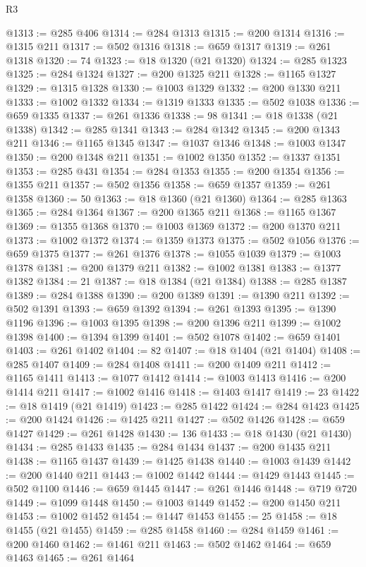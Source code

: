 \begin{lexlean}{R3}
\begin{coremodule}
@1313 := @285 @406
@1314 := @284 @1313
@1315 := @200 @1314
@1316 := @1315 @211
@1317 := @502 @1316
@1318 := @659 @1317
@1319 := @261 @1318
@1320 := 74
@1323 := @18 @1320 (@21 @1320)
@1324 := @285 @1323
@1325 := @284 @1324
@1327 := @200 @1325 @211
@1328 := @1165 @1327
@1329 := @1315 @1328
@1330 := @1003 @1329
@1332 := @200 @1330 @211
@1333 := @1002 @1332
@1334 := @1319 @1333
@1335 := @502 @1038
@1336 := @659 @1335
@1337 := @261 @1336
@1338 := 98
@1341 := @18 @1338 (@21 @1338)
@1342 := @285 @1341
@1343 := @284 @1342
@1345 := @200 @1343 @211
@1346 := @1165 @1345
@1347 := @1037 @1346
@1348 := @1003 @1347
@1350 := @200 @1348 @211
@1351 := @1002 @1350
@1352 := @1337 @1351
@1353 := @285 @431
@1354 := @284 @1353
@1355 := @200 @1354
@1356 := @1355 @211
@1357 := @502 @1356
@1358 := @659 @1357
@1359 := @261 @1358
@1360 := 50
@1363 := @18 @1360 (@21 @1360)
@1364 := @285 @1363
@1365 := @284 @1364
@1367 := @200 @1365 @211
@1368 := @1165 @1367
@1369 := @1355 @1368
@1370 := @1003 @1369
@1372 := @200 @1370 @211
@1373 := @1002 @1372
@1374 := @1359 @1373
@1375 := @502 @1056
@1376 := @659 @1375
@1377 := @261 @1376
@1378 := @1055 @1039
@1379 := @1003 @1378
@1381 := @200 @1379 @211
@1382 := @1002 @1381
@1383 := @1377 @1382
@1384 := 21
@1387 := @18 @1384 (@21 @1384)
@1388 := @285 @1387
@1389 := @284 @1388
@1390 := @200 @1389
@1391 := @1390 @211
@1392 := @502 @1391
@1393 := @659 @1392
@1394 := @261 @1393
@1395 := @1390 @1196
@1396 := @1003 @1395
@1398 := @200 @1396 @211
@1399 := @1002 @1398
@1400 := @1394 @1399
@1401 := @502 @1078
@1402 := @659 @1401
@1403 := @261 @1402
@1404 := 82
@1407 := @18 @1404 (@21 @1404)
@1408 := @285 @1407
@1409 := @284 @1408
@1411 := @200 @1409 @211
@1412 := @1165 @1411
@1413 := @1077 @1412
@1414 := @1003 @1413
@1416 := @200 @1414 @211
@1417 := @1002 @1416
@1418 := @1403 @1417
@1419 := 23
@1422 := @18 @1419 (@21 @1419)
@1423 := @285 @1422
@1424 := @284 @1423
@1425 := @200 @1424
@1426 := @1425 @211
@1427 := @502 @1426
@1428 := @659 @1427
@1429 := @261 @1428
@1430 := 136
@1433 := @18 @1430 (@21 @1430)
@1434 := @285 @1433
@1435 := @284 @1434
@1437 := @200 @1435 @211
@1438 := @1165 @1437
@1439 := @1425 @1438
@1440 := @1003 @1439
@1442 := @200 @1440 @211
@1443 := @1002 @1442
@1444 := @1429 @1443
@1445 := @502 @1100
@1446 := @659 @1445
@1447 := @261 @1446
@1448 := @719 @720
@1449 := @1099 @1448
@1450 := @1003 @1449
@1452 := @200 @1450 @211
@1453 := @1002 @1452
@1454 := @1447 @1453
@1455 := 25
@1458 := @18 @1455 (@21 @1455)
@1459 := @285 @1458
@1460 := @284 @1459
@1461 := @200 @1460
@1462 := @1461 @211
@1463 := @502 @1462
@1464 := @659 @1463
@1465 := @261 @1464

\end{coremodule}
\end{lexlean}
